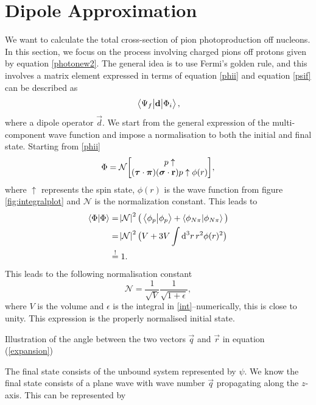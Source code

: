 \section{Dipole Approximation}\label{sec:dipoleapprox}
We want to calculate the total cross-section of pion photoproduction off nucleons. In this section, we focus on the process involving charged pions off protons given by equation \eqref{photonew2}. The general idea is to use Fermi's golden rule, and this involves a matrix element expressed in terms of equation \eqref{phii} and equation \eqref{psif} can be described as
\begin{equation}
	\mel{\Psi_f}{\bm{\mathrm{d}}}{\Phi_i},
\end{equation}
where a dipole operator $\vec{d}$. We start from the general expression of the multi-component wave function and impose a normalisation to both the initial and final state. Starting from \eqref{phii}
\begin{align}
	\Phi = \mathcal{N} \mqty[p\uparrow \\ (\vec{\tau}\cdot \vec{\pi})(\vec{\sigma}\cdot \vec{r})p\uparrow \phi(r)],
\end{align}
where $\uparrow$ represents the spin state, $\phi(r)$ is the wave function from figure \ref{fig:integralplot} and $\mathcal{N}$ is the normalization constant. This leads to
\begin{align}
	\braket{\Phi}{\Phi} &= \abs{\mathcal{N}}^2 \big( \braket{\phi_p}{\phi_p}+ \braket{\phi_{N\pi}}{\phi_{N\pi}} \big) \\
	&= \abs{\mathcal{N}}^2 \big( V+3V\int \text{d}^3r \, r^2 \phi(r)^2 \big)\label{int} \\
	&\stackrel{!}{=} 1.
\end{align} 
This leads to the following normalisation constant
\begin{equation}
	\mathcal{N} = \frac{1}{\sqrt{V}}\frac{1}{\sqrt{1+\epsilon}},
\end{equation}
where $V$ is the volume and $\epsilon$ is the integral in \eqref{int}--numerically, this is close to unity. This expression is the properly normalised initial state. 
\begin{marginfigure}
	\centering
	
	\caption{Illustration of the angle between the two vectors $\vec{q}$ and $\vec{r}$ in equation (\ref{expansion})}
	\label{normsphere}
\end{marginfigure}
The final state consists of the unbound system represented by $\psi$. We know the final state consists of a plane wave with wave number $\vec{q}$ propagating along the $z$-axis. This can be represented by 
